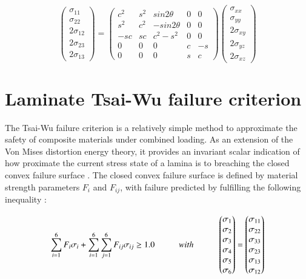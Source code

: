 \begin{equation} 
\begin{pmatrix}
\sigma_{11} \\
\sigma_{22} \\
2\sigma_{12}\\
2\sigma_{23} \\
2\sigma_{13}
\end{pmatrix}
=
\begin{pmatrix}
c^2 & s^2 & sin2\theta & 0 & 0 \\
s^2 & c^2 & -sin2\theta & 0 & 0 \\
-sc & sc & c^2 - s^2 & 0 & 0 \\
0 & 0 & 0 & c & -s \\
0 & 0 & 0 & s & c
\end{pmatrix}
\begin{pmatrix}
\sigma_{xx} \\
\sigma_{yy} \\
2\sigma_{xy}\\
2\sigma_{yz} \\
2\sigma_{xz}
\end{pmatrix}
\label{eqscomp_stress_recovery2}
\end{equation}

\section{Laminate Tsai-Wu failure criterion}
\label{tsai wu background}
The Tsai-Wu failure criterion is a relatively simple method to approximate the safety of composite materials under combined loading. As an extension of the Von Mises distortion energy theory, it provides an invariant scalar indication of how proximate the current stress state of a lamina is to breaching the closed convex failure surface \cite{tsai12}. The closed convex failure surface is defined by material strength parameters $F_i$ and $F_{ij}$, with failure predicted by fulfilling the following inequality \cite{reddy2004mechanics}:

\begin{equation} 
\sum_{i=1}^{6} F_i \sigma_i + \sum_{i=1}^{6} \sum_{j=1}^{6} F_{ij} \sigma_{ij} \geq 1.0
\hspace{10mm}with\hspace{10mm}
\begin{pmatrix}
\sigma_{1} \\
\sigma_{2} \\
\sigma_{3}\\
\sigma_{4} \\
\sigma_{5} \\
\sigma_{6}
\end{pmatrix}
=
\begin{pmatrix}
\sigma_{11} \\
\sigma_{22} \\
\sigma_{33}\\
\sigma_{23} \\
\sigma_{13} \\
\sigma_{12}
\end{pmatrix}
\label{eqscomp_tsai1}
\end{equation}

